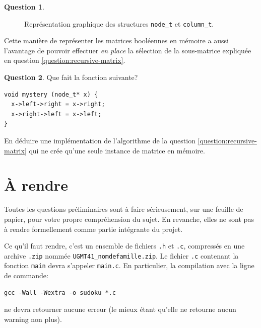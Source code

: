 \documentclass[french,a4paper]{article}
\theoremstyle{definition}
\newtheorem{question}{Question}
\theoremstyle{remark}
\newcommand{\shell}[1]{\lstinline[style={},style=sh]|#1|}
\newcommand{\inlinec}[1]{\lstinline[style=C]°#1°}
\begin{document}
\begin{question}
\begin{figure}[h]
%
    \caption{%
      Représentation graphique des structures \inlinec{node_t} et
      \inlinec{column_t}.}%
    \label{fig:4-way-matrix}%
  \end{figure}
\end{question}

Cette manière de représenter les matrices booléennes en mémoire a
aussi l'avantage de pouvoir effectuer {\em en place} la sélection de
la sous-matrice expliquée en question \ref{question:recursive-matrix}.

\begin{question}
  Que fait la fonction suivante?
  \begin{lstlisting}
void mystery (node_t* x) {
  x->left->right = x->right;
  x->right->left = x->left;
}
  \end{lstlisting}
  En déduire une implémentation de l'algorithme de la question
  \ref{question:recursive-matrix} qui ne crée qu'une seule instance de
  matrice en mémoire.
\end{question}

\section{\`A rendre}
\label{sec:actual-project}

Toutes les questions préliminaires sont à faire sérieusement, sur une
feuille de papier, pour votre propre compréhension du sujet. En
revanche, elles ne sont pas à rendre formellement comme partie
intégrante du projet.

\medskip

Ce qu'il faut rendre, c'est un ensemble de fichiers \shell{.h} et
\shell{.c}, compressés en une archive \shell{.zip} nommée
\shell{UGMT41_nomdefamille.zip}. Le fichier \shell{.c} contenant la
fonction \inlinec{main} devra s'appeler \shell{main.c}. En
particulier, la compilation avec la ligne de commande:
\begin{lstlisting}[style={},style=sh]
gcc -Wall -Wextra -o sudoku *.c
\end{lstlisting}
ne devra retourner aucune erreur (le mieux étant qu'elle ne retourne
aucun warning non plus).
\end{document}
